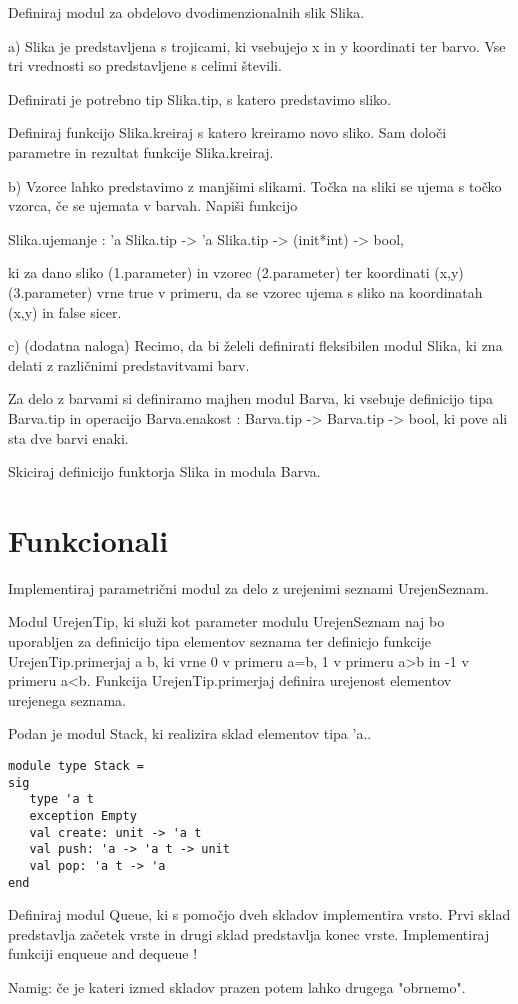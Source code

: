 \begin{ex}
Definiraj modul za obdelovo dvodimenzionalnih slik Slika. 

a) Slika je predstavljena s trojicami, ki vsebujejo x in y koordinati ter barvo. Vse tri vrednosti so predstavljene s celimi \v stevili.   

Definirati je potrebno tip Slika.tip, s katero predstavimo sliko.

Definiraj funkcijo Slika.kreiraj s katero kreiramo novo sliko. Sam dolo\v ci parametre in rezultat funkcije Slika.kreiraj. 

b) Vzorce lahko predstavimo z manj\v simi slikami. To\v cka na sliki se ujema s to\v cko vzorca, \v ce se ujemata v barvah. Napi\v si funkcijo 

Slika.ujemanje : 'a Slika.tip -> 'a Slika.tip -> (init*int) -> bool, 

ki za dano sliko (1.parameter) in vzorec (2.parameter) ter koordinati (x,y) (3.parameter) vrne true v primeru, da se vzorec ujema s sliko na koordinatah (x,y) in false sicer.

c) (dodatna naloga) Recimo, da bi \v zeleli definirati fleksibilen modul Slika, ki zna delati z razli\v cnimi predstavitvami barv. 

Za delo z barvami si definiramo majhen modul Barva, ki vsebuje definicijo tipa Barva.tip in operacijo Barva.enakost : Barva.tip -> Barva.tip -> bool, ki pove ali sta dve barvi enaki. 

Skiciraj definicijo funktorja Slika in modula Barva.

\section{Funkcionali}


\end{ex}
\begin{ex}
Implementiraj parametri\v cni modul za delo z urejenimi seznami UrejenSeznam. 

Modul UrejenTip, ki slu\v zi kot parameter modulu UrejenSeznam naj bo uporabljen za definicijo tipa elementov seznama ter definicjo funkcije UrejenTip.primerjaj a b, ki vrne 0 v primeru a=b, 1 v primeru a>b in -1 v primeru a<b. Funkcija UrejenTip.primerjaj definira urejenost elementov urejenega seznama.
\end{ex}
\begin{ex}
Podan je modul Stack, ki realizira sklad elementov tipa 'a.. 

\begin{lstlisting}
module type Stack = 
sig 
   type 'a t 
   exception Empty 
   val create: unit -> 'a t 
   val push: 'a -> 'a t -> unit 
   val pop: 'a t -> 'a 
end

\end{lstlisting}
Definiraj modul Queue, ki s pomo\v cjo dveh skladov implementira vrsto. Prvi sklad predstavlja za\v cetek vrste in drugi sklad predstavlja konec vrste. Implementiraj funkciji enqueue and dequeue !

Namig: \v ce je kateri izmed skladov prazen potem lahko drugega "obrnemo". 


\end{ex} 
